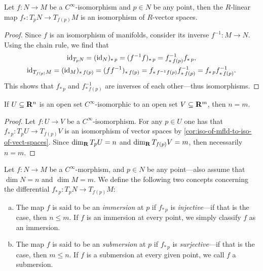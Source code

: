 \begin{corollary}
\label{cor:iso-of-mfld-to-iso-of-vect-spaces}
Let \(f: N \to M\) be a \(C^{\infty}\)-isomorphism and \(p \in N\) be any
point, then the \(R\)-linear map \(f_{*}: T_p N \to T_{f(p)} M\) is an
isomorphism of \(R\)-vector spaces.
\end{corollary}

\begin{proof}
Since \(f\) is an isomorphism of manifolds, consider its inverse \(f^{-1}: M \to
N\). Using the chain rule, we find that
\begin{gather*}
\operatorname{id}_{T_p N} = (\operatorname{id}_N)_{*\, p} = (f^{-1} f)_{*\, p} = f^{-1}_{*\, f(p)} f_{*\, p},
\\
\operatorname{id}_{T_{f(p)} M}
= (\operatorname{id}_M)_{*\, f(p)}
= (f f^{-1})_{*\, f(p)}
= f_{*\, f^{-1} f(p)} f^{-1}_{*\, f(p)}
= f_{*\, p} f^{-1}_{*\, f(p)}.
\end{gather*}
This shows that \(f_{*\, p}\) and \(f^{-1}_{*\, f(p)}\) are inverses of each
other---thus isomorphisms.
\end{proof}

\begin{corollary}
\label{cor:dimension-invariance}
If \(U \subseteq \mathbf{R}^n\) is an open set \(C^{\infty}\)-isomorphic to an open set
\(V \subseteq \mathbf{R}^m\), then \(n = m\).
\end{corollary}

\begin{proof}
Let \(f: U \to V\) be a \(C^{\infty}\)-isomorphism. For any \(p \in U\) one has
that \(f_{*\, p}: T_p U \to T_{f(p)} V\) is an isomorphism of vector spaces by
\cref{cor:iso-of-mfld-to-iso-of-vect-spaces}. Since \(\dim_{\mathbf{R}} T_p U = n\) and
\(\dim_{\mathbf{R}} T_{f(p)} V = m\), then necessarily \(n = m\).
\end{proof}

\begin{definition}
\label{def:immersion-and-submersion}
Let \(f: N \to M\) be a \(C^{\infty}\)-morphism, and \(p \in N\) be any
point---also assume that \(\dim N = n\) and \(\dim M = m\). We define the
following two concepts concerning the differential
\(f_{*\, p}: T_p N \to T_{f(p)} M\):
\begin{enumerate}[(a)]\setlength\itemsep{0em}
\item The map \(f\) is said to be an \emph{immersion} at \(p\) if \(f_{*\, p}\)
  is \emph{injective}---if that is the case, then \(n \leq m\). If \(f\) is an
  immersion at every point, we simply classify \(f\) as an immersion.
\item The map \(f\) is said to be an \emph{submersion} at \(p\) if \(f_{*\, p}\)
  is \emph{surjective}---if that is the case, then \(m \leq n\). If \(f\) is a
  submersion at every given point, we call \(f\) a submersion.
\end{enumerate}
\end{definition}

